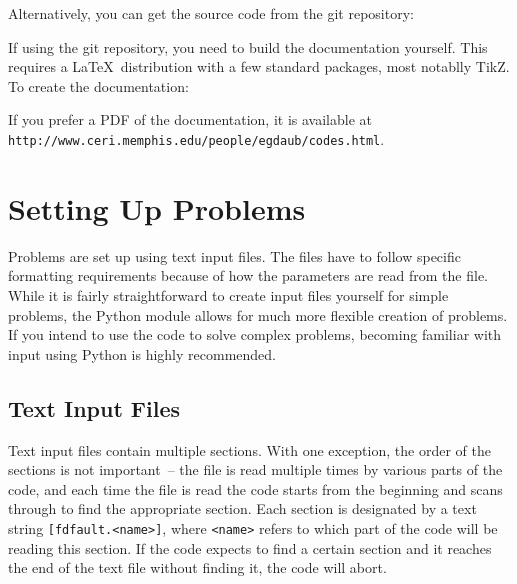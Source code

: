 \documentclass[12pt]{article}   	%
\begin{document}
Alternatively, you can get the source code from the git repository:

\vspace{0.1in}

\vspace{0.1in}
If using the git repository, you need to build the documentation yourself. This requires a \LaTeX\ distribution with a few standard packages, most notablly TikZ. To create the documentation:

\vspace{0.1in}

\vspace{0.1in}
\noindent If you prefer a PDF of the documentation, it is available at \\
{\tt http://www.ceri.memphis.edu/people/egdaub/codes.html}.

\section{Setting Up Problems}

Problems are set up using text input files. The files have to follow specific formatting requirements because of how the parameters are read from the file. While it is fairly straightforward to create input files yourself for simple problems, the Python module allows for much more flexible creation of problems. If you intend to use the code to solve complex problems, becoming familiar with input using Python is highly recommended.

\subsection{Text Input Files}

Text input files contain multiple sections. With one exception, the order of the sections is not important~-- the file is read multiple times by various parts of the code, and each time the file is read the code starts from the beginning and scans through to find the appropriate section. Each section is designated by a text string {\tt [fdfault.<name>]}, where {\tt <name>} refers to which part of the code will be reading this section. If the code expects to find a certain section and it reaches the end of the text file without finding it, the code will abort.
\end{document}
